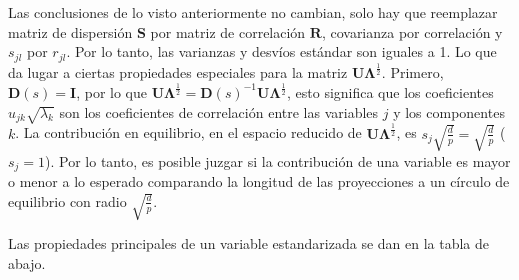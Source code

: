 \documentclass[]{book}
\theoremstyle{definition}
\theoremstyle{definition}
\theoremstyle{definition}
\theoremstyle{remark}
\begin{document}
Las conclusiones de lo visto anteriormente no cambian, solo hay que
reemplazar matriz de dispersión \(\mathbf{S}\) por matriz de correlación
\(\mathbf{R}\), covarianza por correlación y \(s_{jl}\) por \(r_{jl}\).
Por lo tanto, las varianzas y desvíos estándar son iguales a 1. Lo que
da lugar a ciertas propiedades especiales para la matriz
\(\mathbf{U}\mathbf{\Lambda}^{\frac{1}{2}}\). Primero,
\(\mathbf{D}\left( s \right) = \mathbf{I}\), por lo que
\(\mathbf{U}\mathbf{\Lambda}^{\frac{1}{2}} = \mathbf{D}\left( s \right)^{- 1}\mathbf{U}\mathbf{\Lambda}^{\frac{1}{2}}\),
esto significa que los coeficientes \(u_{jk}\sqrt{\lambda_{k}}\) son los
coeficientes de correlación entre las variables \(j\) y los componentes
\(k\). La contribución en equilibrio, en el espacio reducido de
\(\mathbf{U}\mathbf{\Lambda}^{\frac{1}{2}}\), es
\(s_{j}\sqrt{\frac{d}{p}} = \sqrt{\frac{d}{p}}\) (\(s_{j} = 1\)). Por lo
tanto, es posible juzgar si la contribución de una variable es mayor o
menor a lo esperado comparando la longitud de las proyecciones a un
círculo de equilibrio con radio \(\sqrt{\frac{d}{p}}\).

Las propiedades principales de un variable estandarizada se dan en la
tabla de abajo.
\end{document}
